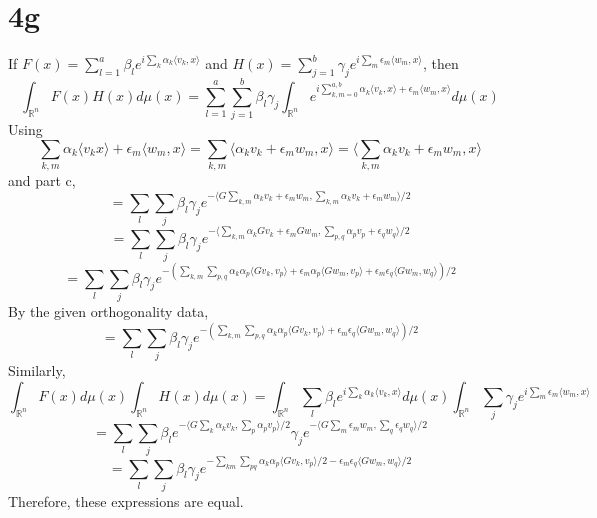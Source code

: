 \documentclass{article}
\begin{document}
\section*{4g}
If $F(x)=\sum_{l=1}^{a}\beta_{l}e^{i\sum_{k}\alpha_{k}\langle v_{k},x \rangle}$ and
$H(x)=\sum_{j=1}^{b}\gamma_{j} e^{i\sum_{m}\epsilon_{m}\langle w_{m},x \rangle}$, then
\[
  \int_{\mathbb{R}^{n}}F(x)H(x)d\mu(x)=\sum_{l=1}^{a}\sum_{j=1}^{b}\beta_{l}\gamma_{j}
  \int_{\mathbb{R}^{n}}e^{i\sum_{k,m=0}^{a,b}\alpha_{k}\langle v_{k},x \rangle+\epsilon_{m}\langle w_{m},x\rangle} d\mu(x)
\]
Using
\[
  \sum_{k,m}\alpha_{k}\langle v_{k}x \rangle+\epsilon_{m}\langle w_{m},x \rangle=\sum_{k,m}\langle \alpha_{k}v_{k}+\epsilon_{m}w_{m},x\rangle
  =\langle \sum_{k,m}\alpha_{k}v_{k}+\epsilon_{m}w_{m},x \rangle
\]
and part c,
\[
  =\sum_{l}\sum_{j}\beta_{l}\gamma_{j}e^{-\langle G\sum_{k,m}\alpha_{k}v_{k}+\epsilon_{m}w_{m}, \sum_{k,m}\alpha_{k}v_{k}+\epsilon_{m}w_{m}\rangle/2}
\]
\[
  =\sum_{l}\sum_{j}\beta_{l}\gamma_{j}e^{-\langle \sum_{k,m}\alpha_{k}Gv_{k}+\epsilon_{m}Gw_{m},\sum_{p,q}\alpha_{p}v_{p}+\epsilon_{q}w_{q} \rangle/2}
\]
\[
  =\sum_{l}\sum_{j}\beta_{l}\gamma_{j}e^{-(\sum_{k,m}\sum_{p,q}\alpha_{k}\alpha_{p}\langle Gv_{k},v_{p}  \rangle
    +\epsilon_{m}\alpha_{p}\langle Gw_{m},v_{p} \rangle+\epsilon_{m}\epsilon_{q}\langle Gw_{m},w_{q} \rangle)/2}
\]
By the given orthogonality data,
\[
  =\sum_{l}\sum_{j}\beta_{l}\gamma_{j}e^{-(\sum_{k,m}\sum_{p,q}\alpha_{k}\alpha_{p}\langle Gv_{k},v_{p} \rangle+\epsilon_{m}\epsilon_{q}\langle Gw_{m},w_{q} \rangle)/2}
\]
Similarly,
\[
  \int_{\mathbb{R}^{n}}F(x)d\mu(x)\int_{\mathbb{R}^{n}}H(x)d\mu(x)
  =\int_{\mathbb{R}^{n}}\sum_{l}\beta_{l}e^{i\sum_{k}\alpha_{k}\langle v_{k} ,x\rangle}d\mu(x)
  \int_{\mathbb{R}^{n}}\sum_{j}\gamma_{j}e^{i\sum_{m}\epsilon_{m}\langle w_{m},x \rangle}
\]
\[
  =\sum_{l}\sum_{j}\beta_{l}e^{-\langle G\sum_{k}\alpha_{k}v_{k},\sum_{p}\alpha_{p}v_{p}\rangle/2}
  \gamma_{j}e^{-\langle G\sum_{m}\epsilon_{m} w_{m},\sum_{q}\epsilon_{q}w_{q} \rangle/2}
\]
\[
  =\sum_{l}\sum_{j}\beta_{l}\gamma_{j}e^{-\sum_{km}\sum_{pq}\alpha_{k}\alpha_{p}\langle Gv_{k},v_{p} \rangle/2
    -\epsilon_{m}\epsilon_{q}\langle Gw_{m},w_{q} \rangle/2}
\]
Therefore, these expressions are equal.
\end{document}
